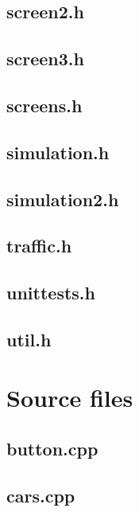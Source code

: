 \documentclass{article}
\begin{document}
  \subsection{screen2.h}
    
  \subsection{screen3.h}
    
  \subsection{screens.h}
    
  \subsection{simulation.h}
    
  \subsection{simulation2.h}
    
  \subsection{traffic.h}
    
  \subsection{unittests.h}
    
  \subsection{util.h}
    
\section{Source files}
  \subsection{button.cpp}
    
  \subsection{cars.cpp}
    
\end{document}
